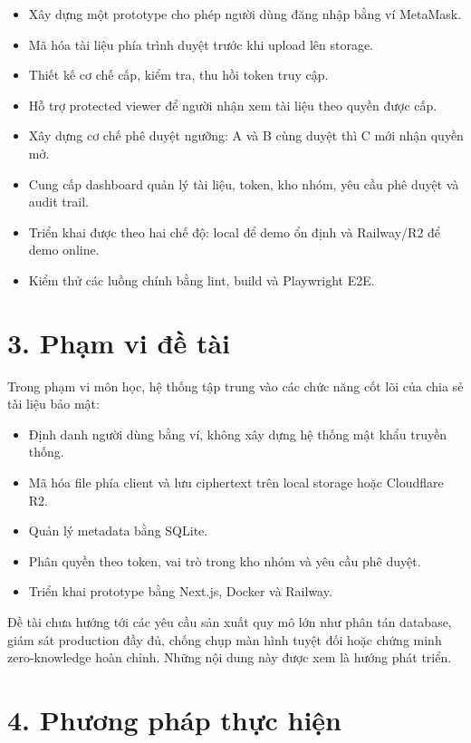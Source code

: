 \begin{itemize}
  \item Xây dựng một prototype cho phép người dùng đăng nhập bằng ví MetaMask.
  \item Mã hóa tài liệu phía trình duyệt trước khi upload lên storage.
  \item Thiết kế cơ chế cấp, kiểm tra, thu hồi token truy cập.
  \item Hỗ trợ protected viewer để người nhận xem tài liệu theo quyền được cấp.
  \item Xây dựng cơ chế phê duyệt ngưỡng: A và B cùng duyệt thì C mới nhận quyền mở.
  \item Cung cấp dashboard quản lý tài liệu, token, kho nhóm, yêu cầu phê duyệt và audit trail.
  \item Triển khai được theo hai chế độ: local để demo ổn định và Railway/R2 để demo online.
  \item Kiểm thử các luồng chính bằng lint, build và Playwright E2E.
\end{itemize}

\section*{3. Phạm vi đề tài}
{}

Trong phạm vi môn học, hệ thống tập trung vào các chức năng cốt lõi của chia sẻ tài liệu bảo mật:

\begin{itemize}
  \item Định danh người dùng bằng ví, không xây dựng hệ thống mật khẩu truyền thống.
  \item Mã hóa file phía client và lưu ciphertext trên local storage hoặc Cloudflare R2.
  \item Quản lý metadata bằng SQLite.
  \item Phân quyền theo token, vai trò trong kho nhóm và yêu cầu phê duyệt.
  \item Triển khai prototype bằng Next.js, Docker và Railway.
\end{itemize}

Đề tài chưa hướng tới các yêu cầu sản xuất quy mô lớn như phân tán database, giám sát production đầy đủ, chống chụp màn hình tuyệt đối hoặc chứng minh zero-knowledge hoàn chỉnh. Những nội dung này được xem là hướng phát triển.

\section*{4. Phương pháp thực hiện}
{}

